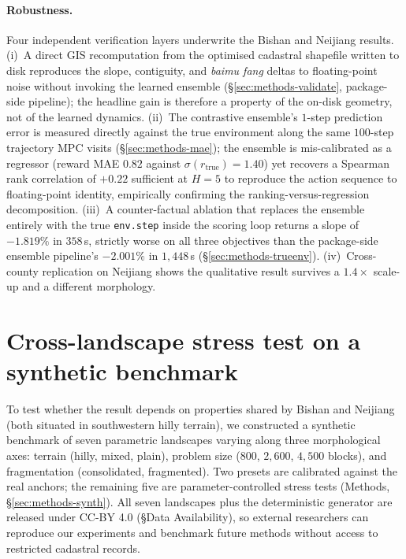 \documentclass[11pt]{article}
\begin{document}
\paragraph{Robustness.} Four independent verification layers underwrite the Bishan and Neijiang results. (i)~A direct GIS recomputation from the optimised cadastral shapefile written to disk reproduces the slope, contiguity, and \textit{baimu fang} deltas to floating-point noise without invoking the learned ensemble (\S\ref{sec:methods-validate}, package-side pipeline); the headline gain is therefore a property of the on-disk geometry, not of the learned dynamics. (ii)~The contrastive ensemble's $1$-step prediction error is measured directly against the true environment along the same $100$-step trajectory MPC visits (\S\ref{sec:methods-mae}); the ensemble is mis-calibrated as a regressor (reward MAE $0.82$ against $\sigma(r_{\text{true}})=1.40$) yet recovers a Spearman rank correlation of $+0.22$ sufficient at $H{=}5$ to reproduce the action sequence to floating-point identity, empirically confirming the ranking-versus-regression decomposition. (iii)~A counter-factual ablation that replaces the ensemble entirely with the true \texttt{env.step} inside the scoring loop returns a slope of $-1.819\%$ in $358$\,s, strictly worse on all three objectives than the package-side ensemble pipeline's $-2.001\%$ in $1{,}448$\,s (\S\ref{sec:methods-trueenv}). (iv)~Cross-county replication on Neijiang shows the qualitative result survives a $1.4\times$ scale-up and a different morphology.

\section{Cross-landscape stress test on a synthetic benchmark}\label{sec:bench}

To test whether the result depends on properties shared by Bishan and Neijiang (both situated in southwestern hilly terrain), we constructed a synthetic benchmark of seven parametric landscapes varying along three morphological axes: terrain (hilly, mixed, plain), problem size ($800$, $2{,}600$, $4{,}500$ blocks), and fragmentation (consolidated, fragmented). Two presets are calibrated against the real anchors; the remaining five are parameter-controlled stress tests (Methods, \S\ref{sec:methods-synth}). All seven landscapes plus the deterministic generator are released under CC-BY 4.0 (\S Data Availability), so external researchers can reproduce our experiments and benchmark future methods without access to restricted cadastral records.
\end{document}
